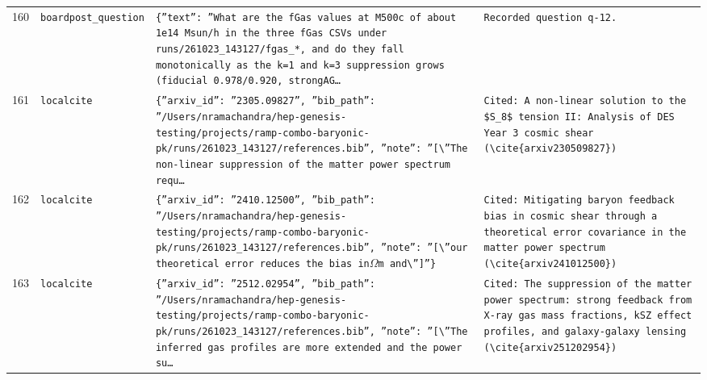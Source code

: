 \documentclass[11pt,a4paper]{article}
\begin{document}
\begin{longtable}{@{}p{}p{}p{}p{}@{}}
160 & \texttt{board}\newline\texttt{post\_\allowbreak{}question} & \texttt{\{''text'':\allowbreak{} ''What are the fGas values at M500c of about 1e14 Msun/\allowbreak{}h in the three fGas CSVs under runs/\allowbreak{}261023\_\allowbreak{}143127/\allowbreak{}fgas\_\allowbreak{}*,\allowbreak{} and do they fall monotonically as the k=\allowbreak{}1 and k=\allowbreak{}3 suppression grows (fiducial 0.978/\allowbreak{}0.920,\allowbreak{} strongAG\ldots{}\allowbreak{}} & \texttt{Recorded question q-12.} \\
161 & \texttt{local}\newline\texttt{cite} & \texttt{\{''arxiv\_\allowbreak{}id'':\allowbreak{} ''2305.09827'',\allowbreak{} ''bib\_\allowbreak{}path'':\allowbreak{} ''/\allowbreak{}Users/\allowbreak{}nramachandra/\allowbreak{}hep-genesis-testing/\allowbreak{}projects/\allowbreak{}ramp-combo-baryonic-pk/\allowbreak{}runs/\allowbreak{}261023\_\allowbreak{}143127/\allowbreak{}references.bib'',\allowbreak{} ''note'':\allowbreak{} ''[\textbackslash{}\allowbreak{}''The non-linear suppression of the matter power spectrum requ\ldots{}\allowbreak{}} & \texttt{Cited:\allowbreak{} A non-linear solution to the \$S\_\allowbreak{}8\$ tension II:\allowbreak{} Analysis of DES Year 3 cosmic shear (\textbackslash{}\allowbreak{}cite\{arxiv230509827\}\allowbreak{})\allowbreak{}} \\
162 & \texttt{local}\newline\texttt{cite} & \texttt{\{''arxiv\_\allowbreak{}id'':\allowbreak{} ''2410.12500'',\allowbreak{} ''bib\_\allowbreak{}path'':\allowbreak{} ''/\allowbreak{}Users/\allowbreak{}nramachandra/\allowbreak{}hep-genesis-testing/\allowbreak{}projects/\allowbreak{}ramp-combo-baryonic-pk/\allowbreak{}runs/\allowbreak{}261023\_\allowbreak{}143127/\allowbreak{}references.bib'',\allowbreak{} ''note'':\allowbreak{} ''[\textbackslash{}\allowbreak{}''our theoretical error reduces the bias in$\Omega$m and\textbackslash{}\allowbreak{}'']\allowbreak{}''\}\allowbreak{}} & \texttt{Cited:\allowbreak{} Mitigating baryon feedback bias in cosmic shear through a theoretical error covariance in the matter power spectrum (\textbackslash{}\allowbreak{}cite\{arxiv241012500\}\allowbreak{})\allowbreak{}} \\
163 & \texttt{local}\newline\texttt{cite} & \texttt{\{''arxiv\_\allowbreak{}id'':\allowbreak{} ''2512.02954'',\allowbreak{} ''bib\_\allowbreak{}path'':\allowbreak{} ''/\allowbreak{}Users/\allowbreak{}nramachandra/\allowbreak{}hep-genesis-testing/\allowbreak{}projects/\allowbreak{}ramp-combo-baryonic-pk/\allowbreak{}runs/\allowbreak{}261023\_\allowbreak{}143127/\allowbreak{}references.bib'',\allowbreak{} ''note'':\allowbreak{} ''[\textbackslash{}\allowbreak{}''The inferred gas profiles are more extended and the power su\ldots{}\allowbreak{}} & \texttt{Cited:\allowbreak{} The suppression of the matter power spectrum:\allowbreak{} strong feedback from X-ray gas mass fractions,\allowbreak{} kSZ effect profiles,\allowbreak{} and galaxy-galaxy lensing (\textbackslash{}\allowbreak{}cite\{arxiv251202954\}\allowbreak{})\allowbreak{}} \\

\end{longtable}
\end{document}
